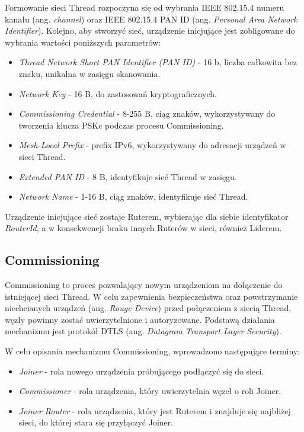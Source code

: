     Formowanie sieci Thread rozpoczyna się od wybrania IEEE 802.15.4 numeru kanału (ang. \textit{channel}) oraz IEEE 802.15.4 PAN ID (ang. \textit{Personal Area Network Identifier}). Kolejno, aby stworzyć sieć, urządzenie inicjujące jest zobligowane do wybrania wartości poniższych parametrów:
    \begin{itemize}
        \item \textit{Thread Network Short PAN Identifier (PAN ID)} - 16 b, liczba całkowita bez znaku, unikalna w zasięgu skanowania.
        \item \textit{Network Key} - 16 B, do zastosowań kryptograficznych.
        \item \textit{Commissioning Credential} - 8-255 B, ciąg znaków, wykorzystywany do tworzenia klucza PSKc podczas procesu Commissioning.
        \item \textit{Mesh-Local Prefix} - prefix IPv6, wykorzystywany do adresacji urządzeń w sieci Thread.
        \item \textit{Extended PAN ID} - 8 B, identyfikuje sieć Thread w zasięgu.
        \item \textit{Network Name} - 1-16 B, ciąg znaków, identyfikuje sieć Thread.
    \end{itemize}{}

    Urządzenie inicjujące sieć zostaje Ruterem, wybierając dla siebie identyfikator \textit{RouterId}, a w konsekwencji braku innych Ruterów w sieci, również Liderem.

    \subsection{Commissioning}
    \label{subsec:commissioning}

    Commissioning to proces pozwalający nowym urządzeniom na dołączenie do istniejącej sieci Thread. W celu zapewnienia bezpieczeństwa oraz powstrzymanie niechcianych urządzeń (ang. \textit{Rouge Device}) przed połączeniem z siecią Thread, węzły powinny zostać uwierzytelnione i autoryzowane. Podstawą działania mechanizmu jest protokół DTLS (ang. \textit{Datagram Transport Layer Security}).

    W celu opisania mechanizmu Commissioning, wprowadzono następujące terminy:
    \begin{itemize}
        \item \textit{Joiner} - rola nowego urządzenia próbującego podłączyć się do sieci.
        \item \textit{Commissioner} - rola urządzenia, który uwierzytelnia węzeł o roli Joiner.
        \item \textit{Joiner Router} - rola urządzenia, który jest Ruterem i znajduje się najbliżej sieci, do której stara się przyłączyć Joiner.
    \end{itemize}

